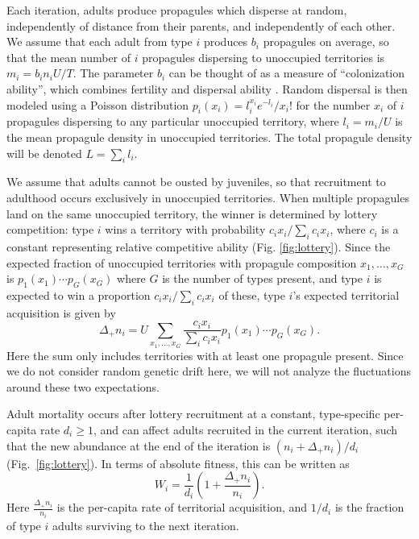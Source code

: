 \documentclass[12pt]{article}
\begin{document}
Each iteration, adults produce propagules which disperse at random, independently of distance from their parents, and independently of each other. We assume that each adult from type $i$ produces $b_i$ propagules on average, so that the mean number of $i$ propagules dispersing to unoccupied territories is $m_i=b_in_iU/T$. The parameter $b_i$ can be thought of as a measure of ``colonization ability'', which combines fertility and dispersal ability \citep{levins_71,tilman_94}. Random dispersal is then modeled using a Poisson distribution $p_i(x_i)=l_i^{x_i} e^{-l_i}/x_i!$ for the number $x_i$ of $i$ propagules dispersing to any particular unoccupied territory, where $l_i=m_i/U$ is the mean propagule density in unoccupied territories. The total propagule density will be denoted $L=\sum_i l_i$.

We assume that adults cannot be ousted by juveniles, so that recruitment to adulthood occurs exclusively in unoccupied territories. When multiple propagules land on the same unoccupied territory, the winner is determined by lottery competition: type $i$ wins a territory with probability $c_i x_i/\sum_i c_i x_i$, where $c_i$ is a constant representing relative competitive ability (Fig. \ref{fig:lottery}). Since the expected fraction of unoccupied territories with propagule composition $x_1,\ldots,x_G$ is $p_1(x_1)\cdots p_G(x_G)$ where $G$ is the number of types present, and type $i$ is expected to win a proportion $c_i x_i/\sum_i c_i x_i$ of these, type $i$'s expected territorial acquisition is given by
\begin{equation}
\Delta_+ n_i=U\sum_{x_1,\ldots,x_G} \frac{c_i x_i}{\sum_i c_i x_i} p_1(x_1)\cdots p_G(x_G). \label{eq:growthsumuncoupled}
\end{equation}
Here the sum only includes territories with at least one propagule present. Since we do not consider random genetic drift here, we will not analyze the fluctuations around these two expectations.

Adult mortality occurs after lottery recruitment at a constant, type-specific per-capita rate $d_i\geq 1$, and can affect adults recruited in the current iteration, such that the new abundance at the end of the iteration is $(n_i+\Delta_+ n_i)/d_i$ (Fig.~\ref{fig:lottery}). In terms of absolute fitness, this can be written as
\begin{equation}
W_i=\frac{1}{d_i}\left(1+\frac{\Delta_+ n_i}{n_i}\right). \label{eq:absfit}
\end{equation}
Here $\frac{\Delta_+ n_i}{n_i}$ is the per-capita rate of territorial acquisition, and $1/d_i$ is the fraction of type $i$ adults surviving to the next iteration.
\end{document}
